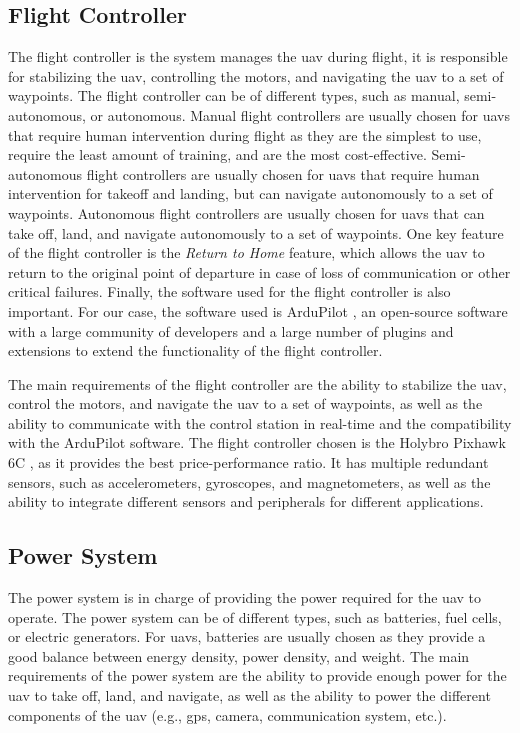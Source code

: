 \subsection{Flight Controller}

The flight controller is the system manages the \gls{uav} during flight, it is responsible for stabilizing the \gls{uav}, controlling the motors, and navigating the \gls{uav} to a set of waypoints. The flight controller can be of different types, such as manual, semi-autonomous, or autonomous. Manual flight controllers are usually chosen for \glspl{uav} that require human intervention during flight as they are the simplest to use, require the least amount of training, and are the most cost-effective. Semi-autonomous flight controllers are usually chosen for \glspl{uav} that require human intervention for takeoff and landing, but can navigate autonomously to a set of waypoints. Autonomous flight controllers are usually chosen for \glspl{uav} that can take off, land, and navigate autonomously to a set of waypoints. One key feature of the flight controller is the \textit{Return to Home} feature, which allows the \gls{uav} to return to the original point of departure in case of loss of communication or other critical failures. Finally, the software used for the flight controller is also important. For our case, the software used is ArduPilot \autocite{ardupilotArduPilot}, an open-source software with a large community of developers and a large number of plugins and extensions to extend the functionality of the flight controller.

The main requirements of the flight controller are the ability to stabilize the \gls{uav}, control the motors, and navigate the \gls{uav} to a set of waypoints, as well as the ability to communicate with the control station in real-time and the compatibility with the ArduPilot software. The flight controller chosen is the Holybro Pixhawk 6C \autocite{rcinnovationsPixhawkCarcasa}, as it provides the best price-performance ratio. It has multiple redundant sensors, such as accelerometers, gyroscopes, and magnetometers, as well as the ability to integrate different sensors and peripherals for different applications.

\subsection{Power System}\label{subsec:design_power_system}

The power system is in charge of providing the power required for the \gls{uav} to operate. The power system can be of different types, such as batteries, fuel cells, or electric generators. For \glspl{uav}, batteries are usually chosen as they provide a good balance between energy density, power density, and weight. The main requirements of the power system are the ability to provide enough power for the \gls{uav} to take off, land, and navigate, as well as the ability to power the different components of the \gls{uav} (e.g., \gls{gps}, camera, communication system, etc.).

